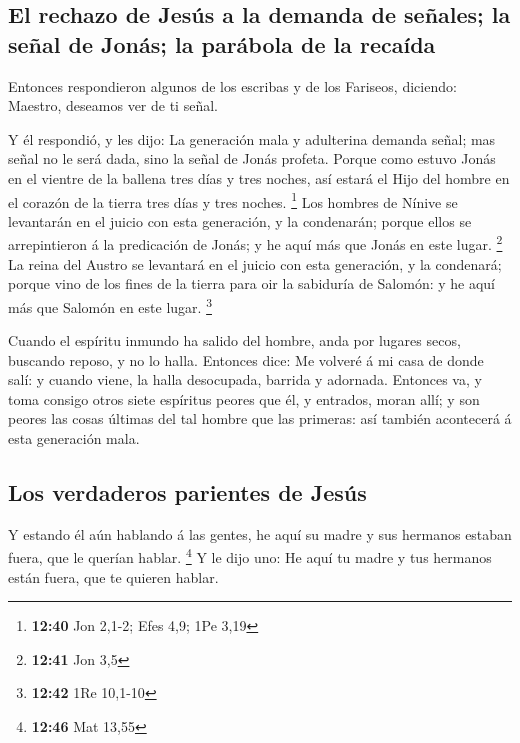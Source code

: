 \hypertarget{el-rechazo-de-jesuxfas-a-la-demanda-de-seuxf1ales-la-seuxf1al-de-jonuxe1s-la-paruxe1bola-de-la-recauxedda}{%
\subsection{El rechazo de Jesús a la demanda de señales; la señal de
Jonás; la parábola de la
recaída}\label{el-rechazo-de-jesuxfas-a-la-demanda-de-seuxf1ales-la-seuxf1al-de-jonuxe1s-la-paruxe1bola-de-la-recauxedda}}

 Entonces respondieron algunos de los escribas y de los
Fariseos, diciendo: Maestro, deseamos ver de ti señal.

 Y él respondió, y les dijo: La generación mala y
adulterina demanda señal; mas señal no le será dada, sino la señal de
Jonás profeta.  Porque como estuvo Jonás en el vientre de
la ballena tres días y tres noches, así estará el Hijo del hombre en el
corazón de la tierra tres días y tres noches. \footnote{\textbf{12:40}
  Jon 2,1-2; Efes 4,9; 1Pe 3,19}  Los hombres de Nínive se
levantarán en el juicio con esta generación, y la condenarán; porque
ellos se arrepintieron á la predicación de Jonás; y he aquí más que
Jonás en este lugar. \footnote{\textbf{12:41} Jon 3,5}  La
reina del Austro se levantará en el juicio con esta generación, y la
condenará; porque vino de los fines de la tierra para oir la sabiduría
de Salomón: y he aquí más que Salomón en este lugar. \footnote{\textbf{12:42}
  1Re 10,1-10}

 Cuando el espíritu inmundo ha salido del hombre, anda por
lugares secos, buscando reposo, y no lo halla.  Entonces
dice: Me volveré á mi casa de donde salí: y cuando viene, la halla
desocupada, barrida y adornada.  Entonces va, y toma
consigo otros siete espíritus peores que él, y entrados, moran allí; y
son peores las cosas últimas del tal hombre que las primeras: así
también acontecerá á esta generación mala.

\hypertarget{los-verdaderos-parientes-de-jesuxfas}{%
\subsection{Los verdaderos parientes de
Jesús}\label{los-verdaderos-parientes-de-jesuxfas}}

 Y estando él aún hablando á las gentes, he aquí su madre y
sus hermanos estaban fuera, que le querían hablar. \footnote{\textbf{12:46}
  Mat 13,55}  Y le dijo uno: He aquí tu madre y tus
hermanos están fuera, que te quieren hablar.

